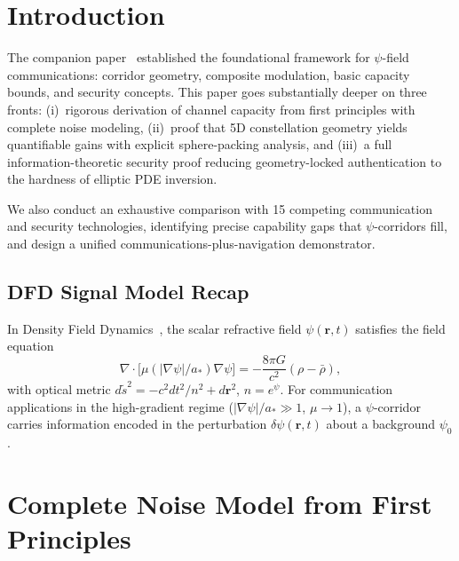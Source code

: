 \documentclass[twocolumn,superscriptaddress,prd,nofootinbib]{revtex4-2}
\newcommand{\astar}{a_*}
\begin{document}
\section{Introduction}\label{sec:intro}

The companion paper~\cite{Alcock2025PsiComms} established the
foundational framework for $\psi$-field communications: corridor
geometry, composite modulation, basic capacity bounds, and security
concepts. This paper goes substantially deeper on three fronts:
(i)~rigorous derivation of channel capacity from first principles with
complete noise modeling, (ii)~proof that 5D constellation geometry
yields quantifiable gains with explicit sphere-packing analysis, and
(iii)~a full information-theoretic security proof reducing
geometry-locked authentication to the hardness of elliptic PDE inversion.

We also conduct an exhaustive comparison with 15 competing communication
and security technologies, identifying precise capability gaps that
$\psi$-corridors fill, and design a unified communications-plus-navigation
demonstrator.

\subsection{DFD Signal Model Recap}

In Density Field Dynamics~\cite{Alcock2025DFD}, the scalar refractive
field $\psi(\mathbf{r},t)$ satisfies the field equation
\begin{equation}
\nabla \cdot \bigl[\mu(|\nabla\psi|/\astar)\nabla\psi\bigr]
= -\frac{8\pi G}{c^2}(\rho - \bar\rho),
\label{eq:field-eq}
\end{equation}
with optical metric
$d\tilde{s}^2 = -c^2 dt^2/n^2 + d\mathbf{r}^2$, $n = e^\psi$.
For communication applications in the high-gradient regime
($|\nabla\psi|/\astar \gg 1$, $\mu \to 1$), a $\psi$-corridor carries
information encoded in the perturbation
$\delta\psi(\mathbf{r},t)$ about a background $\psi_0$.

\section{Complete Noise Model from First Principles}\label{sec:noise}
\end{document}
